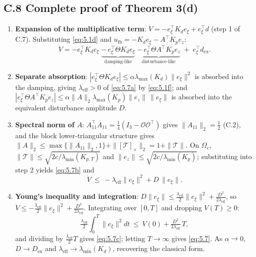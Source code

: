 \subsection*{C.8 Complete proof of Theorem 3(d)}

\begin{enumerate}[leftmargin=2em]
  \item \textbf{Expansion of the multiplicative term}: $\dot V=-e_\xi^\top K_de_\xi+e_\xi^\top d$ (step 1 of C.7). Substituting \eqref{eq:5.1d} and $u_{\mathrm{fb}}=-K_de_\xi-A^\top K_pe_z$:
  \begin{equation*}
  \dot V=-e_\xi^\top K_de_\xi\;\underbrace{-\,e_\xi^\top\Theta K_de_\xi}_{\text{damping-like}}\;\underbrace{-\,e_\xi^\top\Theta A^\top K_pe_z}_{\text{disturbance-like}}\;+\;e_\xi^\top d_{\mathrm{ex}} .
  \end{equation*}

  \item \textbf{Separate absorption}: $|e_\xi^\top\Theta K_de_\xi|\le\alpha\lambda_{\max}(K_d)\|e_\xi\|^2$ is absorbed into the damping, giving $\lambda_{\mathrm{eff}}>0$ of \eqref{eq:5.7a} by \eqref{eq:5.1f}; and $|e_\xi^\top\Theta A^\top K_pe_z|\le\alpha\|A\|_2\lambda_{\max}(K_p)\|e_z\|\,\|e_\xi\|$ is absorbed into the equivalent disturbance amplitude $D$.

  \item \textbf{Spectral norm of $A$}: $A_{11}^\top A_{11}=\tfrac14(I_3-\mathcal O\mathcal O^\top)$ gives $\|A_{11}\|_2=\tfrac12$ (C.2), and the block lower-triangular structure gives $\|A\|_2\le\max\{\|A_{11}\|_2,1\}+\|[\mathcal T]_\times\|_2=1+\|\mathcal T\|$. On $\Omega_c$, $\|\mathcal T\|\le\sqrt{2c/\lambda_{\min}(K_{p,T})}$ and $\|e_z\|\le\sqrt{2c/\lambda_{\min}(K_p)}$; substituting into step 2 yields \eqref{eq:5.7b} and
  \begin{equation}
  \dot V\ \le\ -\lambda_{\mathrm{eff}}\|e_\xi\|^2+D\,\|e_\xi\| .
  \tag{5.7d}\label{eq:5.7d}
  \end{equation}

  \item \textbf{Young's inequality and integration}: $D\|e_\xi\|\le\tfrac{\lambda_{\mathrm{eff}}}2\|e_\xi\|^2+\tfrac{D^2}{2\lambda_{\mathrm{eff}}}$, so $\dot V\le-\tfrac{\lambda_{\mathrm{eff}}}2\|e_\xi\|^2+\tfrac{D^2}{2\lambda_{\mathrm{eff}}}$. Integrating over $[0,T]$ and dropping $V(T)\ge0$:
  \begin{equation*}
  \tfrac{\lambda_{\mathrm{eff}}}2\int_0^T\|e_\xi\|^2dt
  \ \le\ V(0)+\tfrac{D^2}{2\lambda_{\mathrm{eff}}}\,T ,
  \end{equation*}
  and dividing by $\tfrac{\lambda_{\mathrm{eff}}}2T$ gives \eqref{eq:5.7c}; letting $T\to\infty$ gives \eqref{eq:5.7}. As $\alpha\to0$, $D\to D_{\mathrm{ex}}$ and $\lambda_{\mathrm{eff}}\to\lambda_{\min}(K_d)$, recovering the classical form.
\end{enumerate}

